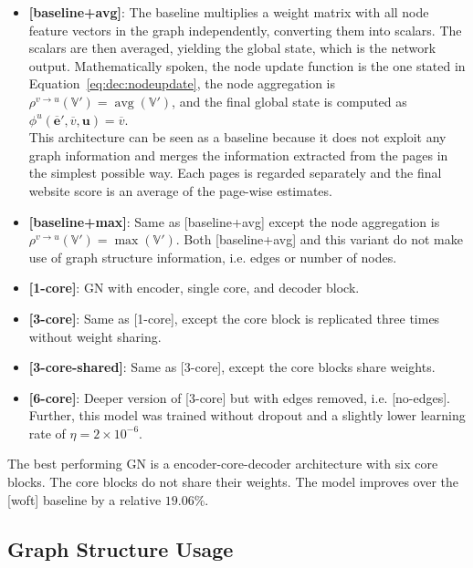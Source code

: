 \begin{itemize}
    \item \textbf{[baseline+avg]}: The baseline multiplies a weight matrix with all node feature vectors in the graph independently, converting them into scalars. The scalars are then averaged, yielding the global state, which is the network output. Mathematically spoken, the node update function is the one stated in Equation~\ref{eq:dec:nodeupdate}, the node aggregation is $\rho^{v\rightarrow u}\left(\mathbb{V}'\right)=\operatorname{avg}\left(\mathbb{V}'\right)$, and the final global state is computed as $\phi^u\left(\bm{\overline{e}}',\overline{v},\bm{u}\right)=\overline{v}$.\\
    This architecture can be seen as a baseline because it does not exploit any graph information and merges the information extracted from the pages in the simplest possible way. Each pages is regarded separately and the final website score is an average of the page-wise estimates.
    \item \textbf{[baseline+max]}: Same as [baseline+avg] except the node aggregation is $\rho^{v\rightarrow u}\left(\mathbb{V}'\right)=\operatorname{max}\left(\mathbb{V}'\right)$. Both [baseline+avg] and this variant do not make use of graph structure information, i.e. edges or number of nodes.
    \item \textbf{[1-core]}: GN with encoder, single core, and decoder block.
    \item \textbf{[3-core]}: Same as [1-core], except the core block is replicated three times without weight sharing.
    \item \textbf{[3-core-shared]}: Same as [3-core], except the core blocks share weights.
    \item \textbf{[6-core]}: Deeper version of [3-core] but with edges removed, i.e. [no-edges]. Further, this model was trained without dropout and a slightly lower learning rate of $\eta=2\times10^{-6}$.
\end{itemize}

The best performing GN is a encoder-core-decoder architecture with six core blocks. The core blocks do not share their weights. The model improves over the [woft] baseline by a relative $19.06\%$.

\subsection{Graph Structure Usage}
\label{sec:graphstructureusage}

